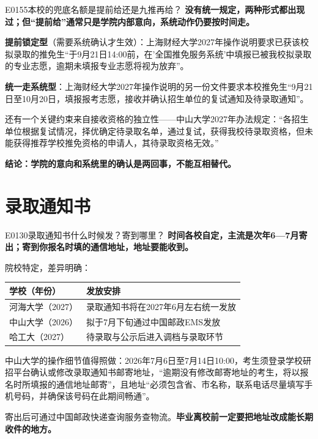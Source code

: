\begin{qa}{E0155}{本校的兜底名额是提前给还是九推再给？}
\textbf{没有统一规定，两种形式都出现过；但“提前给”通常只是学院内部意向，系统动作仍要按时间走。}

\textbf{提前锁定型}（需要系统确认才生效）：上海财经大学2027年操作说明要求已获该校拟录取的推免生“于9月21日14:00前，在'全国推免服务系统'中填报已被我校拟录取的专业志愿，逾期未填报专业志愿将视为放弃”。

\textbf{统一走系统型}：上海财经大学2027年操作说明的另一份文件要求本校推免生“9月21日至10月20日，填报报考志愿，接收并确认招生单位的复试通知及待录取通知”。

还有一个关键约束来自接收资格的独立性——中山大学2027年办法规定：“各招生单位根据复试情况，择优确定待录取名单，通过复试，获得我校待录取资格，但未能获得推荐学校推免资格的申请人，其待录取资格无效。”

\textbf{结论：学院的意向和系统里的确认是两回事，不能互相替代。}
\end{qa}

\section{录取通知书}
\begin{qa}{E0130}{录取通知书什么时候发？寄到哪里？}
\textbf{时间各校自定，主流是次年6—7月寄出；寄到你报名时填的通信地址，地址要能收到。}

院校特定，差异明确：

\par\vspace{2pt}\nobreak\begin{center}\footnotesize
\begin{tabularx}{\textwidth}{>{\raggedright\arraybackslash}X>{\raggedright\arraybackslash}X}
\toprule
\textbf{学校（年份）} & \textbf{发放安排} \\ \midrule
河海大学（2027） & 录取通知书将在2027年6月左右统一发放 \\
中山大学（2026） & 拟于7月下旬通过中国邮政EMS发放 \\
哈工大（2027） & 待录取与公示后进入调档与录取环节 \\
\bottomrule
\end{tabularx}
\end{center}\vspace{2pt}\par

中山大学的操作细节值得照做：2026年7月6日至7月14日10:00，考生须登录学校研招平台确认或修改录取通知书邮寄地址，“逾期没有修改邮寄地址的考生，将以报名时所填报的通信地址邮寄”，且地址“必须包含省、市名称，联系电话尽量填写手机号码，并确保该号码在此期间畅通”。

寄出后可通过中国邮政快递查询服务查物流。\textbf{毕业离校前一定要把地址改成能长期收件的地方。}
\end{qa}

